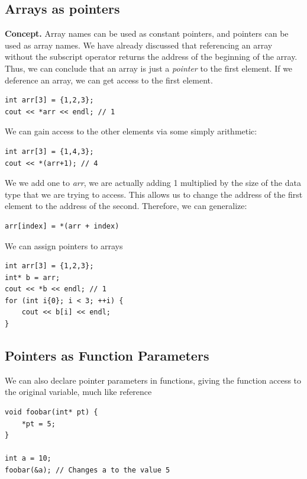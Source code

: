 \documentclass{report}
\begin{document}
    \subsection{Arrays as pointers}
    \bigbreak \noindent 
    \textbf{Concept.} Array names can be used as constant pointers, and pointers can be used as array names.
    \bigbreak \noindent 
    We have already discussed that referencing an array without the subscript operator returns the address of the beginning of the array. Thus, we can conclude that an array is just a \textit{pointer} to the first element.
    \bigbreak \noindent 
    If we deference an array, we can get access to the first element.
    \bigbreak \noindent 
    \sepline
    \begin{verbatim}
int arr[3] = {1,2,3};
cout << *arr << endl; // 1
    \end{verbatim}
    \sepline
    \bigbreak \noindent 
    We can gain access to the other elements via some simply arithmetic:
    \bigbreak \noindent 
    \sepline
    \begin{verbatim}
int arr[3] = {1,4,3};
cout << *(arr+1); // 4
    \end{verbatim}
    \sepline
    \bigbreak \noindent 
    We we add one to \textit{arr}, we are actually adding 1 multiplied by the size of the data type that we are trying to access. This allows us to change the address of the first element to the address of the second.
    \bigbreak \noindent 
    Therefore, we can generalize:
    \bigbreak \noindent 
    \sepline
    \begin{verbatim}
arr[index] = *(arr + index)
    \end{verbatim}
    \sepline

    \bigbreak \noindent 
    We can assign pointers to arrays
    \bigbreak \noindent 
    \sepline
    \begin{verbatim}
int arr[3] = {1,2,3};
int* b = arr;
cout << *b << endl; // 1
for (int i{0}; i < 3; ++i) {
    cout << b[i] << endl;
}
    \end{verbatim}
    \sepline

    \pagebreak \bigbreak \noindent 
    \subsection{Pointers as Function Parameters}
    \bigbreak \noindent 
    We can also declare pointer parameters in functions, giving the function access to the original variable, much like reference
    \bigbreak \noindent 
    \sepline
    \begin{verbatim}
void foobar(int* pt) {
    *pt = 5;
}

int a = 10;
foobar(&a); // Changes a to the value 5

    \end{verbatim}
    \sepline
\end{document}
